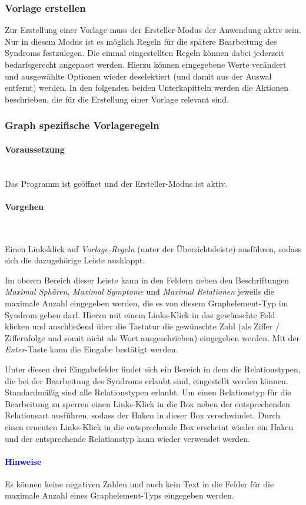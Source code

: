 \documentclass[enabledeprecatedfontcommands,fontsize=11pt,paper=a4,twoside]{scrartcl}
\newcounter{one}
\newcounter{two}[one]
\newcommand*{\hint}{\paragraph{\textcolor{blue}{Hinweise}}}
\newcommand*{\condition}{\paragraph{Voraussetzung}$\;$ \vspace{0.2cm}\\}
\newcommand*{\actions}{\paragraph{Vorgehen} $\;$\vspace{0.2cm}\\}
\let\tempone\itemize
\let\temptwo\enditemize
\renewenvironment{itemize}{\tempone\addtolength{\itemsep}{-10.0pt}}{\temptwo}
\let\origenumerate\enumerate
\let\origendenumerate\endenumerate
\renewenvironment{enumerate}{\origenumerate \addtolength{\itemsep}{-10.0pt}}{\origendenumerate}
\begin{document}
\subsubsection{Vorlage erstellen}
Zur Erstellung einer Vorlage muss der Ersteller-Modus der Anwendung aktiv sein. Nur in diesem Modus ist es möglich Regeln für die spätere Bearbeitung des Syndroms festzulegen. Die einmal eingestellten Regeln können dabei jederzeit bedarfsgerecht angepasst werden. Hierzu können eingegebene Werte verändert und ausgewählte Optionen wieder deselektiert (und damit aus der Auswal entfernt) werden. In den folgenden beiden Unterkapitteln werden die Aktionen beschrieben, die für die Erstellung einer Vorlage relevant sind.
\subsubsection{Graph spezifische Vorlageregeln}
\condition 
Das Programm ist geöffnet und der Ersteller-Modus ist aktiv.
\actions
\begin{enumerate}
\item Einen Linksklick auf \textit{Vorlage-Regeln} (unter der Übersichtsleiste) ausführen, sodass sich die dazugehörige Leiste ausklappt.
\item Im oberen Bereich dieser Leiste kann in den Feldern neben den Beschriftungen \textit{Maximal Sphären}, \textit{Maximal Symptome} und \textit{Maximal Relationen} jeweils die maximale Anzahl eingegeben werden, die es von diesem Graphelement-Typ im Syndrom geben darf. Hierzu mit einem Links-Klick in das gewünschte Feld klicken und anschließend über die Tastatur die gewünschte Zahl (als Ziffer / Ziffernfolge und somit nicht als Wort ausgeschrieben) eingegeben werden. Mit der \textit{Enter}-Taste kann die Eingabe bestätigt werden.
\item Unter diesen drei Eingabefelder findet sich ein Bereich in dem die Relationstypen, die bei der Bearbeitung des Syndroms erlaubt sind, eingestellt werden können. Standardmäßig sind alle Relationstypen erlaubt. Um einen Relationstyp für die Bearbeitung zu sperren einen Links-Klick in die Box neben der entsprechenden Relationsart ausführen, sodass der Haken in dieser Box verschwindet. Durch einen erneuten Links-Klick in die entsprechende Box erscheint wieder ein Haken und der entsprechende Relationstyp kann wieder verwendet werden.
\end{enumerate} 
\hint
\begin{itemize}
\item Es können keine negativen Zahlen und auch kein Text in die Felder für die maximale Anzahl eines Graphelement-Typs eingegeben werden.
\end{itemize}
\end{document}
